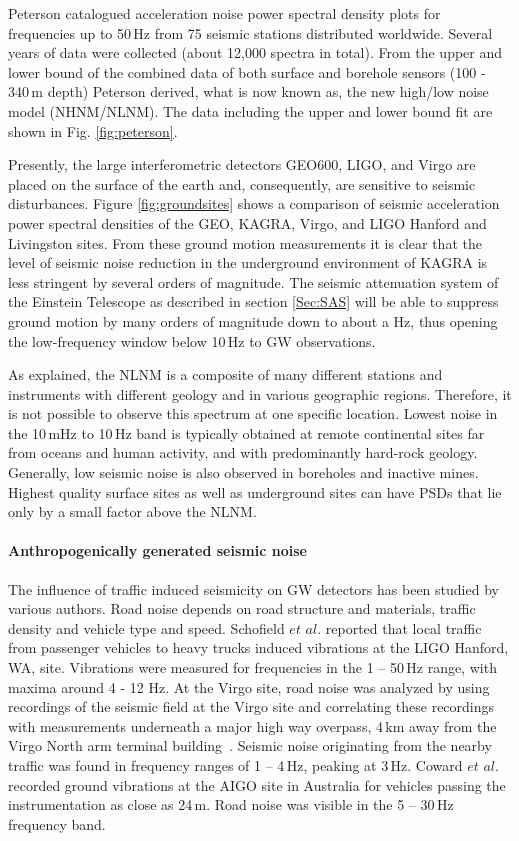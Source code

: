 Peterson \cite{Peterson1993} catalogued acceleration noise power spectral density plots for frequencies up to 50\,Hz from 75 seismic stations distributed worldwide. Several years of data were collected (about 12,000 spectra in total). From the upper and lower bound of the combined data of both surface and borehole sensors (100 - 340\,m depth) Peterson derived, what is now known as, the new high/low noise model (NHNM/NLNM). The data including the upper and lower bound fit are shown in Fig. \ref{fig:peterson}. 

Presently, the large interferometric detectors GEO600, LIGO, and Virgo are placed on the surface of the earth and, consequently, are sensitive to seismic disturbances. Figure \ref{fig:groundsites} shows a comparison of seismic acceleration power spectral densities of the GEO, KAGRA, Virgo, and LIGO Hanford and Livingston sites. From these ground motion measurements it is clear that the level of seismic noise reduction in the underground environment of KAGRA is less stringent by several orders of magnitude.  The seismic attenuation system of the Einstein Telescope as described in section \ref{Sec:SAS} will be able to suppress ground motion by many orders of magnitude down to about a Hz, thus opening the low-frequency window below 10\,Hz to GW observations.

As explained, the NLNM is a composite of many different stations and instruments with different geology and in various geographic regions. Therefore, it is not possible to observe this spectrum at one specific location. Lowest noise in the 10\,mHz to 10\,Hz band is typically obtained at remote continental sites far from oceans and human activity, and with predominantly hard-rock geology. Generally, low seismic noise is also observed in boreholes and inactive mines. Highest quality surface sites as well as underground sites can have PSDs that lie only by a small factor above the NLNM.

\paragraph{Anthropogenically generated seismic noise}
The influence of traffic induced seismicity on GW detectors has been studied by various authors. Road noise depends on road structure and materials, traffic density and vehicle type and speed. Schofield $et$ $al.$ \cite{Schofield2000} reported that local traffic from passenger vehicles to heavy trucks induced vibrations at the LIGO Hanford, WA, site. Vibrations were measured for frequencies in the 1 -- 50\,Hz range, with maxima around 4 - 12 Hz. At the Virgo site, road noise was analyzed by using recordings of the seismic field at the Virgo site and correlating these recordings with measurements underneath a major high way overpass, 4\,km away from the Virgo North arm terminal building~\cite{VIR-NOT-FIR-1390-251}. Seismic noise originating from the nearby traffic was found in frequency ranges of 1 -- 4\,Hz, peaking at 3\,Hz. Coward $et$ $al.$ \cite{Coward2003} recorded ground vibrations at the AIGO site in Australia for vehicles passing the instrumentation as close as 24\,m. Road noise was visible in the 5 -- 30\,Hz frequency band.

